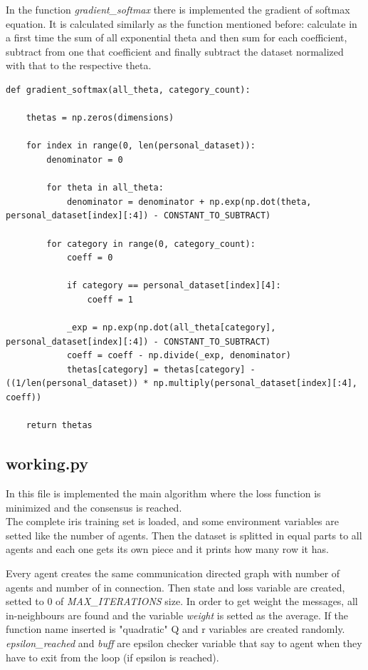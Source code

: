 \documentclass[a4paper,11pt,oneside]{book}
\begin{document}
In the function \textit{gradient\_softmax} there is implemented the gradient of softmax equation. It is calculated similarly as the function mentioned before: calculate in a first time the sum of all exponential theta and then sum for
each coefficient, subtract from one that coefficient and finally subtract the dataset normalized with that to the respective
theta.

\begin{lstlisting}
def gradient_softmax(all_theta, category_count):

    thetas = np.zeros(dimensions)

    for index in range(0, len(personal_dataset)):
        denominator = 0

        for theta in all_theta:
            denominator = denominator + np.exp(np.dot(theta, personal_dataset[index][:4]) - CONSTANT_TO_SUBTRACT)

        for category in range(0, category_count):
            coeff = 0

            if category == personal_dataset[index][4]:
                coeff = 1

            _exp = np.exp(np.dot(all_theta[category], personal_dataset[index][:4]) - CONSTANT_TO_SUBTRACT)
            coeff = coeff - np.divide(_exp, denominator)
            thetas[category] = thetas[category] - ((1/len(personal_dataset)) * np.multiply(personal_dataset[index][:4], coeff))

    return thetas
\end{lstlisting}

\subsection {working.py}

In this file is implemented the main algorithm where the loss function is minimized and the consensus is reached.\\

The complete iris training set is loaded, and some environment variables are setted like the number of agents. Then the dataset is splitted in equal parts to all agents and each one gets its own piece and it prints how many row it has.

Every agent creates the same communication directed graph with number of agents and number of in connection. Then state and
loss variable are created, setted to 0 of \textit{MAX\_ITERATIONS} size. In order to get weight the messages, all in-neighbours
are found and the variable \textit{weight} is setted as the average. If the function name inserted is "quadratic" Q and r
variables are created randomly. \textit{epsilon\_reached} and \textit{buff} are epsilon checker variable that say to agent
when they have to exit from the loop (if epsilon is reached).
\end{document}
